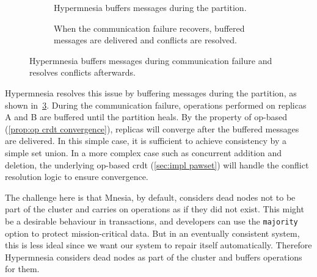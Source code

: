 \begin{figure}[htp]
\begin{subfigure}[t]{0.9\columnwidth}
    \caption{Hypermnesia buffers messages during the partition.}
    \label{subfig:hypermnesia comm failure b}
  \end{subfigure}

  \begin{subfigure}[t]{0.9\columnwidth}
    \centering
    \caption{When the communication failure recovers, buffered messages are delivered
    and conflicts are resolved.}
    \label{fig:hypermnesia comm failure}
  \end{subfigure}
  \caption{Hypermnesia buffers messages during communication failure and resolves
  conflicts afterwards.}
\end{figure}


Hypermnesia resolves this issue by buffering messages during the partition, as
shown in~\cref{fig:hypermnesia comm failure}. During the communication failure, 
operations performed on replicas A and B are buffered until the partition heals. 
By the property of op-based  (\cref{prop:op crdt convergence}),
replicas will converge after the buffered messages are delivered.
In this simple case, it is sufficient to achieve consistency by a simple set 
union. In a more complex case
such as concurrent addition and deletion, the underlying op-based 
\acrshort{crdt} (\cref{sec:impl pawset}) will handle the conflict resolution 
logic to ensure convergence.

The challenge here is that Mnesia, by default, considers dead nodes not to be 
part of the
cluster and carries on operations as if they did not exist. This might be a
desirable behaviour in transactions, and developers can use the \texttt{majority}
option to protect mission-critical data. But in an eventually consistent system,
this is less ideal since we want our system to repair itself automatically.
Therefore Hypermnesia considers dead nodes as part of the cluster and buffers
operations for them.

